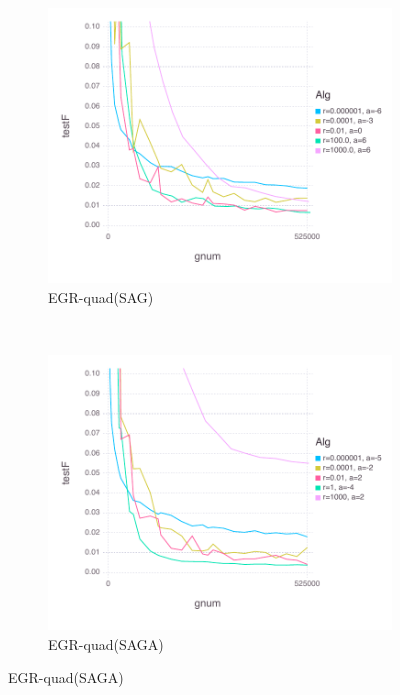 \documentclass[11pt]{article}
\begin{document}
\begin{figure}[H]
   	    \begin{subfigure}[b]{0.45\textwidth}
              \includegraphics[width=\textwidth]{Figures/myrandBLtrueffFinal-quadfalse.pdf}
              \caption{EGR-quad(SAG)}
          \end{subfigure}
          ~ %
          \begin{subfigure}[b]{0.45\textwidth}
              \includegraphics[width=\textwidth]{Figures/myrandBLtrueffFinal-quadtrue.pdf}
              \caption{EGR-quad(SAGA)}
          \end{subfigure}
	   

\end{figure}
\end{document}
